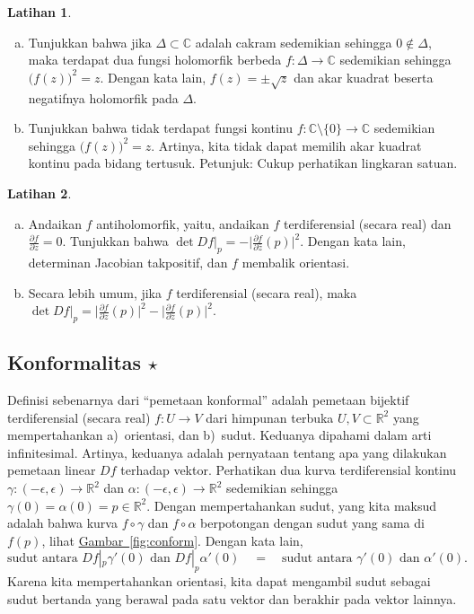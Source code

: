 \documentclass[12pt,openany]{book}
\newcommand{\babs}[1]{\bigl\lvert {#1} \bigr\rvert}
\newcommand{\C}{{\mathbb{C}}}
\newcommand{\R}{{\mathbb{R}}}
\newcommand{\myquote}[1]{``#1''}
\theoremstyle{plain}
\theoremstyle{remark}
\theoremstyle{definition}
\newenvironment{exbox}{%
    \def\FrameCommand{\vrule width 1pt \relax\hspace{10pt}}%
    \MakeFramed{\advance\hsize-\width\FrameRestore}%
}{%
    \endMakeFramed
}
\newenvironment{exparts}{%
    \leavevmode\begin{enumerate}[a),noitemsep,topsep=0pt,parsep=0pt,partopsep=0pt]
}{%
    \end{enumerate}
}
\theoremstyle{exercise}
\newtheorem{exercise}{Latihan}[section]
\theoremstyle{example}
\newcommand{\figureref}[1]{\hyperref[#1]{Gambar~\ref*{#1}}}
\begin{document}
\begin{exbox}
\begin{exercise}
\begin{exparts}
\item
Tunjukkan bahwa jika $\Delta \subset \C$ adalah cakram sedemikian sehingga $0 \notin \Delta$, maka
terdapat dua fungsi holomorfik berbeda $f \colon \Delta \to \C$ sedemikian sehingga
${\bigl(f(z)\bigr)}^2 = z$.  Dengan kata lain, $f(z) = \pm \sqrt{z}$ dan
akar kuadrat beserta negatifnya holomorfik pada $\Delta$.
\item
Tunjukkan bahwa tidak terdapat fungsi kontinu $f \colon \C \setminus \{ 0 \}
\to \C$ sedemikian sehingga ${\bigl(f(z)\bigr)}^2 = z$.  Artinya, kita tidak dapat memilih
akar kuadrat kontinu pada bidang tertusuk.  Petunjuk: Cukup perhatikan lingkaran
satuan.
\end{exparts}
\end{exercise}

\begin{exercise}
\begin{exparts}
\item
Andaikan $f$ antiholomorfik, yaitu, andaikan $f$ terdiferensial (secara real)
dan $\frac{\partial f}{\partial z} = 0$.  Tunjukkan bahwa
$\det Df\big|_p = - \babs{\frac{\partial f}{\partial \bar{z}}(p)}^2$.  Dengan kata lain,
determinan Jacobian takpositif, dan $f$ membalik orientasi.
\item
Secara lebih umum, jika $f$ terdiferensial (secara real), maka
$\det Df\big|_p = \babs{\frac{\partial f}{\partial z}(p)}^2 -
\babs{\frac{\partial f}{\partial \bar{z}}(p)}^2$.
\end{exparts}
\end{exercise}
\end{exbox}

\subsection{Konformalitas \texorpdfstring{$\star$}{*}}

Definisi sebenarnya dari \myquote{pemetaan konformal} adalah
pemetaan bijektif terdiferensial (secara real) $f \colon U \to V$ dari himpunan terbuka
$U, V \subset \R^2$ yang mempertahankan
a)~orientasi, dan b)~sudut.
Keduanya dipahami dalam arti infinitesimal.
Artinya, keduanya adalah
pernyataan tentang apa yang dilakukan pemetaan linear $Df$ terhadap vektor.
Perhatikan dua kurva terdiferensial kontinu
$\gamma \colon (-\epsilon,\epsilon) \to \R^2$ dan
$\alpha \colon (-\epsilon,\epsilon) \to \R^2$ sedemikian sehingga
$\gamma(0)=\alpha(0) = p \in \R^2$.  Dengan mempertahankan sudut, yang kita
maksud adalah bahwa kurva $f \circ \gamma$ dan $f \circ \alpha$ berpotongan dengan sudut yang sama
di $f(p)$, lihat \figureref{fig:conform}.  Dengan kata lain,
\begin{equation*}
\text{sudut antara } Df|_p \gamma'(0) \text{ dan }
Df|_p \alpha'(0)
\quad = \quad
\text{sudut antara } \gamma'(0) \text{ dan } \alpha'(0) .
\end{equation*}
Karena kita mempertahankan orientasi,
kita dapat mengambil sudut sebagai sudut bertanda yang berawal pada satu vektor dan
berakhir pada vektor lainnya.
\end{document}
